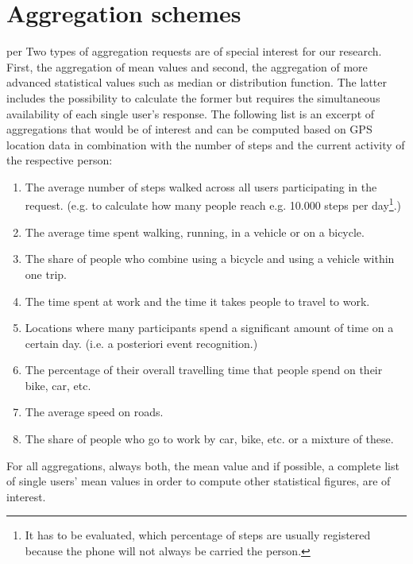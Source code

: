  \section{Aggregation schemes}\label{aggregation-schemes}per
 Two types of aggregation requests are of special interest for our research. First, the aggregation of mean values and second, the aggregation of more advanced statistical values such as median or distribution function. The latter includes the possibility to calculate the former but requires the simultaneous availability of each single user's response. 
 The following list is an excerpt of aggregations that would be of interest and can be computed based on GPS location data in combination with the number of steps and the current activity of the respective person:
 \begin{enumerate}
 	\item The average number of steps walked across all users participating in the request. (e.g. to calculate how many people reach e.g. 10.000 steps per day\footnote{It has to be evaluated, which percentage of steps are usually registered because the phone will not always be carried the person.}.)
	\item The average time spent walking, running, in a vehicle or on a bicycle.
	\item The share of people who combine using a bicycle and using a vehicle within one trip.
	\item The time spent at work and the time it takes people to travel to work.
	\item Locations where many participants spend a significant amount of time on a certain day. (i.e. a posteriori event recognition.)
	\item The percentage of their overall travelling time that people spend on their bike, car, etc.
	\item The average speed on roads.
	\item The share of people who go to work by car, bike, etc. or a mixture of these.
 \end{enumerate}
 For all aggregations, always both, the mean value and if possible, a complete list of single users' mean values in order to compute other statistical figures, are of interest.

